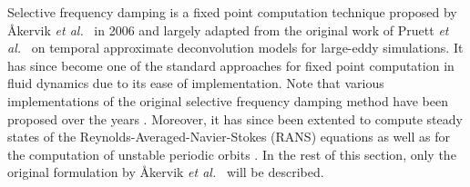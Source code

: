     Selective frequency damping is a fixed point computation technique proposed by {\AA}kervik \emph{et al.}\ \cite{pof:akervik:2006} in 2006 and largely adapted from the original work of Pruett \emph{et al.}\ \cite{pof:pruett:2003, pof:pruett:2006} on temporal approximate deconvolution models for large-eddy simulations. It has since become one of the standard approaches for fixed point computation in fluid dynamics due to its ease of implementation. Note that various implementations of the original selective frequency damping method have been proposed over the years \cite{pof:jordi:2014, pof:jordi:2015, pof:cunha:2015}. Moreover, it has since been extented to compute steady states of the Reynolds-Averaged-Navier-Stokes (RANS) equations \cite{cf:richez:2016} as well as for the computation of unstable periodic orbits \cite{prf:leopold:2017}. In the rest of this section, only the original formulation by {\AA}kervik \emph{et al.}\ \cite{pof:akervik:2006} will be described.

